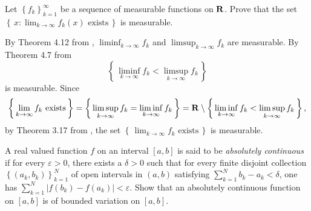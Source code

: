 \begin{problem}
  Let $\left\{f_k\right\}_{k=1}^\infty$ be a sequence of measurable
  functions on $\mathbf{R}$. Prove that the set
  $\left\{\,x:\text{$\lim_{k\to\infty} f_k(x)$ exists}\,\right\}$ is
  measurable.
\end{problem}
\begin{solution}
  By Theorem 4.12 from \cite[Ch.\@ 4, p.\@ 67]{wheeden-zygmund},
  $\liminf_{k\to\infty}f_k$ and $\limsup_{k\to\infty}f_k$ are
  measurable. By Theorem 4.7 from \cite[Ch.\@ 4, p.\@ 66]{wheeden-zygmund}
  \begin{equation}
    \label{eq:prep:1:12}
    \left\{\,\liminf_{k\to\infty} f_k<\limsup_{k\to\infty} f_k\,\right\}
  \end{equation}
  is measurable. Since
  \begin{equation}
    \label{eq:prep:1:13}
    \left\{\,\text{$\lim_{k\to\infty}f_k$ exists}\,\right\}=
    \left\{\,{\limsup_{k\to\infty}f_k=\liminf_{k\to\infty}f_k}\,\right\}=
    \mathbf{R}\setminus
    \left\{\,{\liminf_{k\to\infty} f_k<\limsup_{k\to\infty} f_k}\,\right\},
  \end{equation}
  by Theorem 3.17 from \cite[Ch.\@ 3, p.\@ 48]{wheeden-zygmund}, the set
  $\left\{\,\text{$\lim_{k\to\infty}f_k$ exists}\,\right\}$ is measurable.
\end{solution}
\begin{problem}
  A real valued function $f$ on an interval $[a,b]$ is said to be
  \emph{absolutely continuous} if for every $\varepsilon>0$, there exists a
  $\delta>0$ such that for every finite disjoint collection
  $\left\{(a_k,b_k)\right\}_{k=1}^N$ of open intervals in $(a,b)$
  satisfying $\sum_{k=1}^Nb_k-a_k<\delta$, one has
  $\sum_{k=1}^N\left|f(b_k)-f(a_k)\right|<\varepsilon$. Show that an
  absolutely continuous function on $[a,b]$ is of bounded variation on
  $[a,b]$.
\end{problem}
